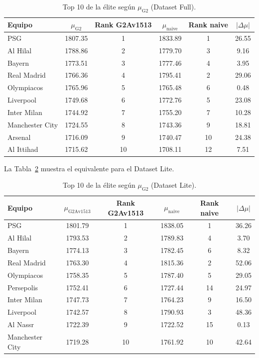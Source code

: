 \begin{table}[htbp]
	\centering
	\caption{Top 10 de la \'elite seg\'un $\mu_{\text{G2}}$ (Dataset Full).}
	\label{tab:app_b_elite_full}
	\small
	\begin{tabular}{lccccc}
		\toprule
		\textbf{Equipo} & $\mu_{\text{G2}}$ & \textbf{Rank G2Av1513} & $\mu_{\text{naive}}$ & \textbf{Rank naive} & $|\Delta \mu|$ \\
		\midrule
		PSG & 1807.35 & 1 & 1833.89 & 1 & 26.55 \\
		Al Hilal & 1788.86 & 2 & 1779.70 & 3 & 9.16 \\
		Bayern & 1773.51 & 3 & 1777.46 & 4 & 3.95 \\
		Real Madrid & 1766.36 & 4 & 1795.41 & 2 & 29.06 \\
		Olympiacos & 1765.96 & 5 & 1765.48 & 6 & 0.48 \\
		Liverpool & 1749.68 & 6 & 1772.76 & 5 & 23.08 \\
		Inter Milan & 1744.92 & 7 & 1755.20 & 7 & 10.28 \\
		Manchester City & 1724.55 & 8 & 1743.36 & 9 & 18.81 \\
		Arsenal & 1716.09 & 9 & 1740.47 & 10 & 24.38 \\
		Al Ittihad & 1715.62 & 10 & 1708.11 & 12 & 7.51 \\
		\bottomrule
	\end{tabular}
\end{table}

La Tabla~\ref{tab:app_b_elite_lite} muestra el equivalente para el Dataset Lite.

\begin{table}[htbp]
	\centering
	\caption{Top 10 de la \'elite seg\'un $\mu_{\text{G2}}$ (Dataset Lite).}
	\label{tab:app_b_elite_lite}
	\small
	\begin{tabular}{lccccc}
		\toprule
		\textbf{Equipo} & $\mu_{\text{G2Av1513}}$ & \textbf{Rank G2Av1513} & $\mu_{\text{naive}}$ & \textbf{Rank naive} & $|\Delta \mu|$ \\
		\midrule
		PSG & 1801.79 & 1 & 1838.05 & 1 & 36.26 \\
		Al Hilal & 1793.53 & 2 & 1789.83 & 4 & 3.70 \\
		Bayern & 1774.13 & 3 & 1782.45 & 6 & 8.32 \\
		Real Madrid & 1763.30 & 4 & 1815.36 & 2 & 52.06 \\
		Olympiacos & 1758.35 & 5 & 1787.40 & 5 & 29.05 \\
		Persepolis & 1752.41 & 6 & 1727.44 & 14 & 24.97 \\
		Inter Milan & 1747.73 & 7 & 1764.23 & 9 & 16.50 \\
		Liverpool & 1742.57 & 8 & 1790.93 & 3 & 48.36 \\
		Al Nassr & 1722.39 & 9 & 1722.52 & 15 & 0.13 \\
		Manchester City & 1719.28 & 10 & 1761.92 & 10 & 42.64 \\
		\bottomrule
	\end{tabular}
\end{table}

